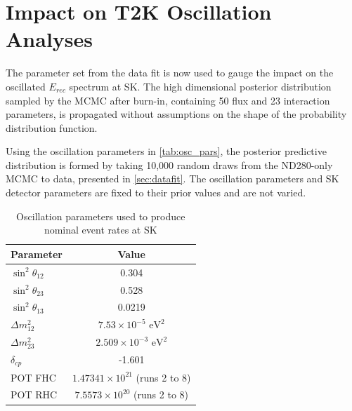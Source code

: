 \section{Impact on T2K Oscillation Analyses}
The parameter set from the data fit is now used to gauge the impact on the oscillated $E_{rec}$ spectrum at SK. The high dimensional posterior distribution sampled by the MCMC after burn-in, containing 50 flux and 23 interaction parameters, is propagated without assumptions on the shape of the probability distribution function.

Using the oscillation parameters in \autoref{tab:osc_pars}, the posterior predictive distribution is formed by taking 10,000 random draws from the ND280-only MCMC to data, presented in \autoref{sec:datafit}. The oscillation parameters and SK detector parameters are fixed to their prior values and are not varied.
\begin{table}[h]
	\begin{tabular}{l | c}
		\hline
		\hline
		Parameter & Value \\
		\hline
		$\sin^2\theta_{12}$ & 0.304 \\
		$\sin^2\theta_{23}$ & 0.528 \\
		$\sin^2\theta_{13}$ & 0.0219 \\
		$\Delta m^2_{12}$  & $7.53\times10^{-5} \text{ eV}^2$ \\
		$\Delta m^2_{23}$  & $2.509\times10^{-3} \text{ eV}^2$ \\
		$\delta_{cp}$ & -1.601 \\
		\hline
		POT FHC & $1.47341\times10^{21}$ (runs 2 to 8)\\ 
		POT RHC & $7.5573\times10^{20}$ (runs 2 to 8)\\
		\hline
		\hline
	\end{tabular}
\caption{Oscillation parameters used to produce nominal event rates at SK}
\label{tab:osc_pars}
\end{table}

